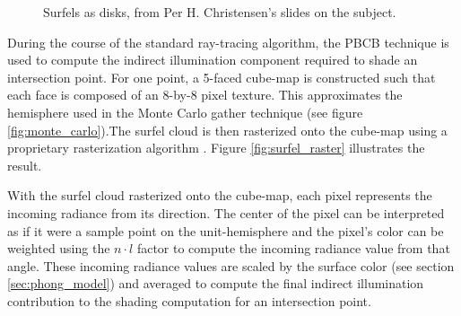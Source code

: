 \begin{figure}
    \centering
    \caption[Surfel Disks]{Surfels as disks, from Per H. Christensen's slides on the subject. \cite{bib:christensen_slides}}
    \label{fig:disk_surfels}
\end{figure}

During the course of the standard ray-tracing algorithm, the PBCB technique is used to compute the indirect illumination component required to shade an intersection point. For one point, a 5-faced cube-map is constructed such that each face is composed of an 8-by-8 pixel texture. This approximates the hemisphere used in the Monte Carlo gather technique (see figure \ref{fig:monte_carlo}).The surfel cloud is then rasterized onto the cube-map using a proprietary rasterization algorithm \cite{bib:christensen2008}. Figure \ref{fig:surfel_raster} illustrates the result.

With the surfel cloud rasterized onto the cube-map, each pixel represents the incoming radiance from its direction. The center of the pixel can be interpreted as if it were a sample point on the unit-hemisphere and the pixel’s color can be weighted using the $n \cdot l$ factor to compute the incoming radiance value from that angle. These incoming radiance values are scaled by the surface color (see section \ref{sec:phong_model}) and averaged to compute the final indirect illumination contribution to the shading computation for an intersection point.

